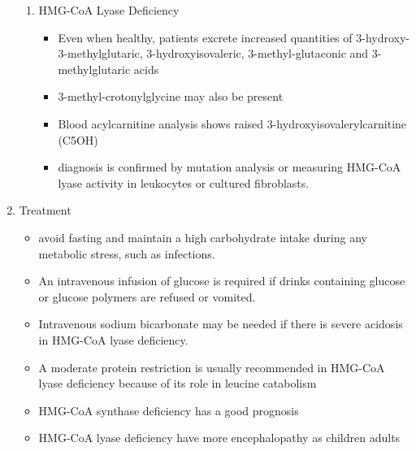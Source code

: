 \documentclass{scrartcl}
\begin{document}
\begin{enumerate}
\begin{enumerate}
\item HMG-CoA Lyase Deficiency
\label{sec:org650ec49}
\begin{itemize}
\item Even when healthy, patients excrete increased quantities of
3-hydroxy-3-methylglutaric, 3-hydroxyisovaleric, 3-methyl-glutaconic
and 3-methylglutaric acids
\item 3-methyl-crotonylglycine may also be present
\item Blood acylcarnitine analysis shows raised
3-hydroxyisovalerylcarnitine (C5OH)
\item diagnosis is confirmed by mutation analysis or measuring HMG-CoA
lyase activity in leukocytes or cultured fibroblasts.
\end{itemize}
\end{enumerate}

\item Treatment
\label{sec:org8decc51}
\begin{itemize}
\item avoid fasting and maintain a high carbohydrate intake during any
metabolic stress, such as infections.
\item An intravenous infusion of glucose is required if drinks containing
glucose or glucose polymers are refused or vomited.
\item Intravenous sodium bicarbonate may be needed if there is severe
acidosis in HMG-CoA lyase deficiency.
\item A moderate protein restriction is usually recommended in HMG-CoA
lyase deficiency because of its role in leucine catabolism
\item HMG-CoA synthase deficiency has a good prognosis
\item HMG-CoA lyase deficiency have more encephalopathy as children adults
\end{itemize}
\end{enumerate}
\end{document}
